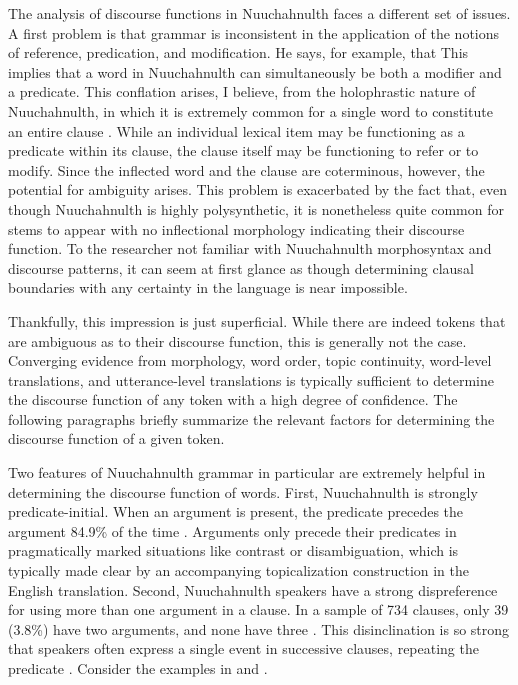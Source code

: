 The analysis of discourse functions in Nuuchahnulth faces a different set of issues. A first problem is that  grammar is inconsistent in the application of the notions of reference, predication, and modification. He says, for example, that  This implies that a word in Nuuchahnulth can simultaneously be both a modifier and a predicate. This conflation arises, I believe, from the holophrastic nature of Nuuchahnulth, in which it is extremely common for a single word to constitute an entire clause . While an individual lexical item may be functioning as a predicate within its clause, the clause itself may be functioning to refer or to modify. Since the inflected word and the clause are coterminous, however, the potential for ambiguity arises. This problem is exacerbated by the fact that, even though Nuuchahnulth is highly polysynthetic, it is nonetheless quite common for stems to appear with no inflectional morphology indicating their discourse function. To the researcher not familiar with Nuuchahnulth morphosyntax and discourse patterns, it can seem at first glance as though determining clausal boundaries with any certainty in the language is near impossible.

Thankfully, this impression is just superficial. While there are indeed tokens that are ambiguous as to their discourse function, this is generally not the case. Converging evidence from morphology, word order, topic continuity, word-level translations, and utterance-level translations is typically sufficient to determine the discourse function of any token with a high degree of confidence. The following paragraphs briefly summarize the relevant factors for determining the discourse function of a given token.

Two features of Nuuchahnulth grammar in particular are extremely helpful in determining the discourse function of words. First, Nuuchahnulth is strongly predicate-initial. When an argument is present, the predicate precedes the argument 84.9\% of the time \parencite[149]{Nakayama2001}. Arguments only precede their predicates in pragmatically marked situations like contrast or disambiguation, which is typically made clear by an accompanying topicalization construction in the English translation. Second, Nuuchahnulth speakers have a strong dispreference for using more than one argument in a clause. In a sample of 734 clauses, only 39 (3.8\%) have two arguments, and none have three \parencite[149]{Nakayama2001}. This disinclination is so strong that speakers often express a single event in successive clauses, repeating the predicate \parencite[75]{Nakayama2001}. Consider the examples in  and .

